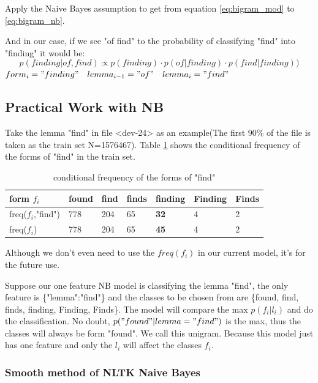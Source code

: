 \documentclass[a4paper]{article}
\begin{document}
Apply the Naive Bayes assumption to get from equation \ref{eq:bigram_mod} to \ref{eq:bigram_nb}. 

And in our case, if we see "of find" to the probability of classifying "find" into "finding"   it would be:
\begin{equation} \label{eq:bigram_find}
p(finding | of,find) \propto p(finding)\cdot p(of | finding) \cdot  p(find | finding)) 
\end{equation}
$form_i="finding" \quad lemma_{i-1}="of" \quad lemma_i="find"$ 


\subsection{Practical Work with NB}

Take the lemma "find" in file <dev-24> as an example(The first 90\% of the file is taken as the train set N=1576467). Table \ref{tb:cfd_find} shows the conditional frequency of the forms of "find" in the train set. 

\begin{table}[htb]
\centering
\begin{tabular}{|l|llllll|}
\hline
form $f_i$       & found & find & finds & finding & Finding & Finds \\ \hline
freq($f_i$,"find") & 778   & 204  & 65    & \textbf{32}      & 4       & 2     \\ \hline
freq($f_i$) & 778   & 204  & 65    & \textbf{45}      & 4       & 2     \\ \hline
\end{tabular}
\caption{conditional frequency of the forms of "find"}
\label{tb:cfd_find}
\end{table}

Although we don't even need to use the $freq(f_i)$ in our current model, it's for the future use.

Suppose our one feature NB model is classifying the lemma "find", the only feature is \{"lemma":"find"\} and the classes to be chosen from are \{found, find, finds, finding, Finding, Finds\}. The model will compare the max $p(f_i|l_i)$ and do the classification. No doubt, $p("found" | lemma="find")$ is the max, thus the classes will always be form "found". We call this unigram. Because this model just has one feature and only the $l_i$ will affect the classes $f_i$. 

\subsubsection{Smooth method of NLTK Naive Bayes}
\end{document}
